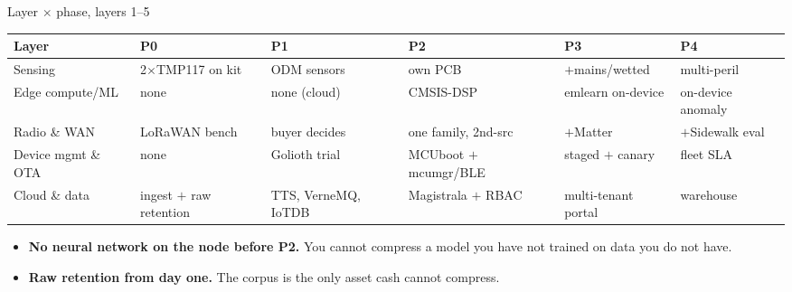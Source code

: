 \documentclass[aspectratio=169,t,10pt,xcolor={table,svgnames}]{beamer}
\newcommand{\hd}[1]{\textbf{\footnotesize #1}}
\begin{document}
\begin{frame}{Layer $\times$ phase, layers 1--5}
  \scriptsize
  \begin{tabular}{@{}p{}p{}p{}p{}p{}p{}@{}}
    \toprule
    \hd{Layer} & \hd{P0} & \hd{P1} & \hd{P2} & \hd{P3} & \hd{P4} \\
    \midrule
    Sensing            & 2$\times$TMP117 on kit & ODM sensors    & \cellcolor{fill1}own PCB      & $+$mains/wetted  & multi-peril \\
    Edge compute/ML    & \cellcolor{fill0}none  & \cellcolor{fill0}none (cloud) & CMSIS-DSP      & emlearn on-device& on-device anomaly \\
    Radio \& WAN       & LoRaWAN bench          & \cellcolor{fill1}buyer decides& one family, 2nd-src & $+$Matter   & $+$Sidewalk eval \\
    Device mgmt \& OTA & \cellcolor{fill0}none  & Golioth trial  & \cellcolor{fill1}MCUboot $+$ mcumgr/BLE & staged $+$ canary & fleet SLA \\
    Cloud \& data      & ingest $+$ raw retention & TTS, VerneMQ, IoTDB & Magistrala $+$ RBAC & multi-tenant portal & warehouse \\
    \bottomrule
  \end{tabular}
  \vspace{0.7em}
  \begin{itemize}\footnotesize
    \item \textbf{No neural network on the node before P2.} You cannot compress a model you have not
          trained on data you do not have.
    \item \textbf{Raw retention from day one.} The corpus is the only asset cash cannot compress.
  \end{itemize}
\end{frame}
\end{document}
